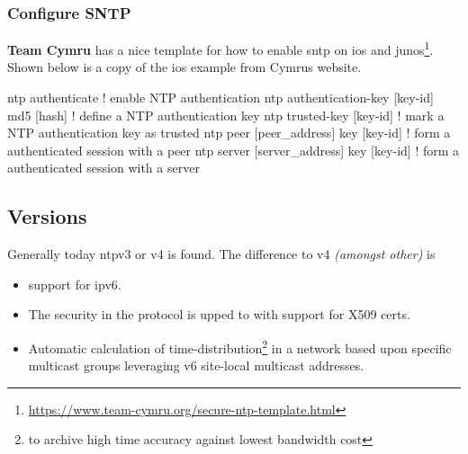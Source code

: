 \subsubsection{Configure SNTP}

\textbf{Team Cymru} has a nice template for how to enable \gls{sntp} on \gls{ios} and \gls{junos}\footnote{\url{https://www.team-cymru.org/secure-ntp-template.html}}. Shown below is a copy of the \gls{ios} example from Cymrus website.

\begin{cisco}
ntp authenticate                            ! enable NTP authentication
ntp authentication-key [key-id] md5 [hash]  ! define a NTP authentication key
ntp trusted-key [key-id]                    ! mark a NTP authentication key as trusted
ntp peer [peer_address] key [key-id]        ! form a authenticated session with a peer
ntp server [server_address] key [key-id]    ! form a authenticated session with a server
\end{cisco}

\subsection{Versions}

Generally today \gls{ntp}v3 or v4 is found. The difference to v4 \textit{(amongst other)} is
\begin{itemize}
	\item support for \gls{ipv6}.
	\item The security in the protocol is upped to with support for X509 certs.
	\item Automatic calculation of time-distribution\footnote{to archive high time accuracy against lowest bandwidth cost} in  a network based upon specific multicast groups leveraging v6 site-local multicast addresses.
\end{itemize}

